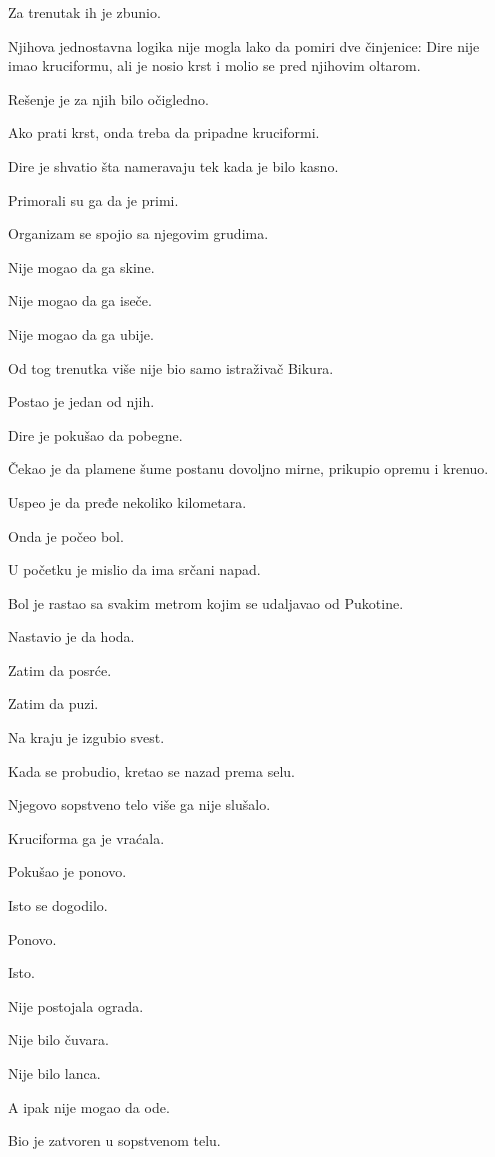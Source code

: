 Za trenutak ih je zbunio.

Njihova jednostavna logika nije mogla lako da pomiri dve činjenice: Dire nije imao kruciformu, ali je nosio krst i molio se pred njihovim oltarom.

Rešenje je za njih bilo očigledno.

Ako prati krst, onda treba da pripadne kruciformi.

Dire je shvatio šta nameravaju tek kada je bilo kasno.

Primorali su ga da je primi.

Organizam se spojio sa njegovim grudima.

Nije mogao da ga skine.

Nije mogao da ga iseče.

Nije mogao da ga ubije.

Od tog trenutka više nije bio samo istraživač Bikura.

Postao je jedan od njih.

\bigskip

Dire je pokušao da pobegne.

Čekao je da plamene šume postanu dovoljno mirne, prikupio opremu i krenuo.

Uspeo je da pređe nekoliko kilometara.

Onda je počeo bol.

U početku je mislio da ima srčani napad.

Bol je rastao sa svakim metrom kojim se udaljavao od Pukotine.

Nastavio je da hoda.

Zatim da posrće.

Zatim da puzi.

Na kraju je izgubio svest.

Kada se probudio, kretao se nazad prema selu.

Njegovo sopstveno telo više ga nije slušalo.

Kruciforma ga je vraćala.

Pokušao je ponovo.

Isto se dogodilo.

Ponovo.

Isto.

Nije postojala ograda.

Nije bilo čuvara.

Nije bilo lanca.

A ipak nije mogao da ode.

Bio je zatvoren u sopstvenom telu.

